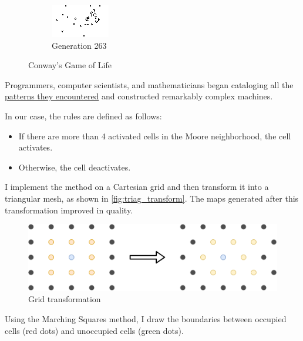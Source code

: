 \documentclass[../main.tex]{subfiles}
\begin{document}
\begin{figure}[H]
\begin{subfigure}{0.35\textwidth}
        \centering
        \includegraphics[width=\textwidth]{IMAGES/part5/CGOF_2.png}
        \caption{Generation 263}
    \end{subfigure}
    \caption{Conway's Game of Life}
    \label{fig:CGOF}
\end{figure}

Programmers, computer scientists, and mathematicians began cataloging all the \href{https://en.wikipedia.org/wiki/Conway's_Game_of_Life#Examples_of_patterns}{patterns they encountered} and constructed remarkably complex machines.

In our case, the rules are defined as follows:
\begin{itemize}  
    \item If there are more than 4 activated cells in the Moore neighborhood, the cell activates. 
    \item Otherwise, the cell deactivates. 
\end{itemize}

I implement the method on a Cartesian grid and then transform it into a triangular mesh, as shown in \autoref{fig:triag_transform}. The maps generated after this transformation improved in quality.

\begin{figure}[H]
	\centering
	\includegraphics[width=0.6\linewidth]{IMAGES/part5/grid_transform_map_generation.png}
	\caption{Grid transformation}
	\label{fig:triag_transform}
\end{figure}

Using the Marching Squares method, I draw the boundaries between occupied cells (red dots) and unoccupied cells (green dots).
\end{document}
